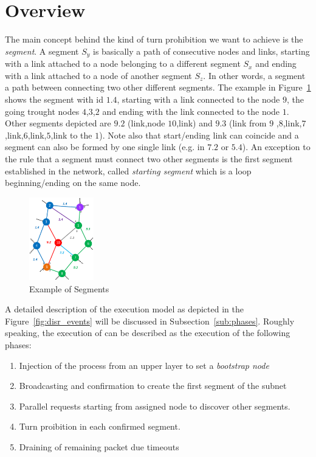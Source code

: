 
\section{\disr{} Overview}

\label{sec:disr_concepts}
The main concept behind the kind of turn prohibition we want to
achieve is the \emph{segment}. A segment $S_y$ is basically a path of consecutive
nodes and links, starting with a link attached to a node belonging to
a different segment $S_x$ and ending with a link attached to a
node of another segment $S_z$. In other words, a segment
a path between connecting two other different segments. The example
in Figure~\ref{fig:segments} shows the segment with id $1.4$, starting
with a link connected to the node $9$, the going trought nodes
$4$,$3$,$2$ and ending with the link connected to the node $1$. Other
segments depicted are $9.2$ (link,node $10$,link) and $9.3$
(link from $9$ ,$8$,link,$7$,link,$6$,link,$5$,link to the $1$). Note
also that start/ending link can coincide and a segment can also be
formed by one single link (e.g. in $7.2$ or $5.4$).
An exception to the rule that a segment must connect two other
segments is the first segment established in the network, called
\emph{starting segment} which is a loop beginning/ending on the same
node.

\begin{figure}
\centering
    \includegraphics[width=0.25\textwidth]{pictures/network_slice.eps}
  \caption{Example of Segments}
  \label{fig:segments}
\end{figure}

A detailed description of the \disr{} execution model as depicted in
the Figure~\ref{fig:disr_events} will be discussed in
Subsection~\ref{sub:phases}. Roughly speaking, the execution of can be described as the execution
of the following phases: 
\begin{enumerate}
\item Injection of the \disr{} process from an upper layer to set a \emph{bootstrap
node} 
\item Broadcasting and confirmation to create the first segment of the subnet
\item Parallel requests starting from assigned node to discover other
segments. 
\item Turn proibition in each confirmed segment.
\item Draining of remaining packet due timeouts
\end{enumerate}


